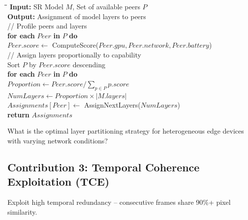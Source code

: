 \documentclass[11pt, a4paper]{article}
\begin{document}
\begin{algorithmbox}
\begin{tabbing}
\hspace{0.5cm}\=\hspace{0.5cm}\=\hspace{0.5cm}\=\kill
\textbf{Input:} SR Model $M$, Set of available peers $P$ \\
\textbf{Output:} Assignment of model layers to peers \\[0.3em]
\textcolor{secondarygreen}{// Profile peers and layers} \\
\> \textbf{for each} $Peer$ \textbf{in} $P$ \textbf{do} \\
\>\> $Peer.score \leftarrow$ ComputeScore($Peer.gpu, Peer.network, Peer.battery$) \\
\textcolor{secondarygreen}{// Assign layers proportionally to capability} \\
\> Sort $P$ by $Peer.score$ descending \\
\> \textbf{for each} $Peer$ \textbf{in} $P$ \textbf{do} \\
\>\> $Proportion \leftarrow Peer.score / \sum_{p \in P} p.score$ \\
\>\> $NumLayers \leftarrow Proportion \times |M.layers|$ \\
\>\> $Assignments[Peer] \leftarrow$ AssignNextLayers($NumLayers$) \\
\> \textbf{return} $Assignments$
\end{tabbing}
\end{algorithmbox}

\begin{researchq}
What is the optimal layer partitioning strategy for heterogeneous edge devices with varying network conditions?
\end{researchq}

\subsection{Contribution 3: Temporal Coherence Exploitation (TCE)}

Exploit high temporal redundancy -- consecutive frames share 90\%+ pixel similarity.
\end{document}
